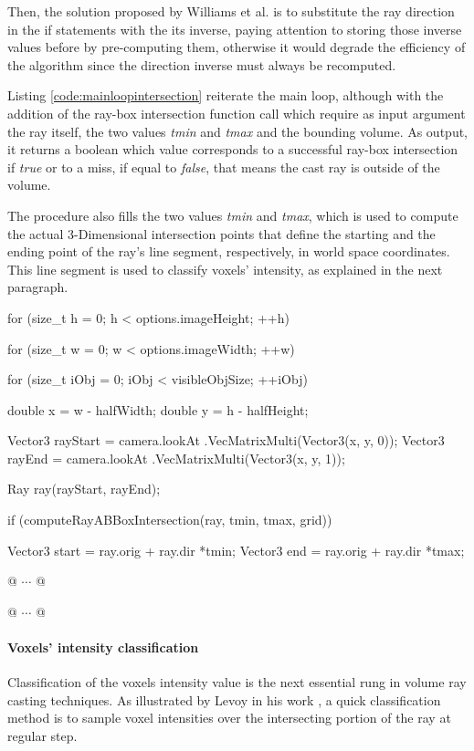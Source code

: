 \documentclass[12pt,a4paper]{extarticle}
\newcommand{\linespace}{\vspace{8pt}}
\begin{document}
Then, the solution proposed by Williams et al. \cite{Williams:2005} is to substitute the ray direction in the if statements with the its inverse, paying attention to storing those inverse values before by pre-computing them, otherwise it would degrade the efficiency of the algorithm since the direction inverse must always be recomputed. 
\linespace 

Listing \ref{code:mainloopintersection} reiterate the main loop, although with the addition of the ray-box intersection function call which require as input argument the ray itself, the two values \textit{tmin} and \textit{tmax} and the bounding volume. As output, it returns a boolean which value corresponds to a successful ray-box intersection if \emph{true} or to a miss, if equal to \emph{false}, that means the cast ray is outside of the volume.

The procedure also fills the two values \textit{tmin} and \textit{tmax}, which is used to compute the actual 3-Dimensional intersection points that define the starting and the ending point of the ray's line segment, respectively, in world space coordinates.
This line segment is used to classify voxels' intensity, as explained in the next paragraph.

\begin{cpp}[caption={Ray casting main loop enriched with ray-box intersection checking statement and ray starting and ending points},label=code:mainloopintersection]
for (size_t h = 0; h < options.imageHeight; ++h) {
	for (size_t w = 0; w < options.imageWidth; ++w) {
		for (size_t iObj = 0; iObj < visibleObjSize; ++iObj) {
			double x = w - halfWidth;
			double y = h - halfHeight;

			Vector3 rayStart = camera.lookAt
						.VecMatrixMulti(Vector3(x, y, 0));
			Vector3 rayEnd = camera.lookAt
						.VecMatrixMulti(Vector3(x, y, 1));

			Ray ray(rayStart, rayEnd);

			if (computeRayABBoxIntersection(ray, tmin, tmax, grid)) {
				Vector3 start = ray.orig + ray.dir *tmin;
				Vector3 end = ray.orig + ray.dir *tmax;
				
				@ $\cdots$ @
			}
			@ $\cdots$ @
		}
	}
}
\end{cpp}
\paragraph{Voxels' intensity classification} Classification of the voxels intensity value is the next essential rung in volume ray casting techniques. As illustrated by Levoy in his work \cite{levoy_1988:4}, a quick classification method is to sample voxel intensities over the intersecting portion of the ray at regular step.
\end{document}

